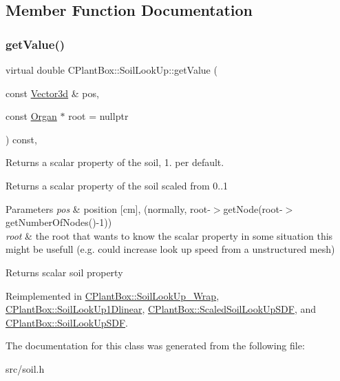 \subsection{Member Function Documentation}
\mbox{\label{classCPlantBox_1_1SoilLookUp_a46ace0d168532b6eb9bec8e6a1d64814}} 
\subsubsection{\texorpdfstring{get\+Value()}{getValue()}}
{\footnotesize\ttfamily virtual double C\+Plant\+Box\+::\+Soil\+Look\+Up\+::get\+Value (\begin{DoxyParamCaption}\item[{const \hyperlink{classCPlantBox_1_1Vector3d}{Vector3d} \&}]{pos,  }\item[{const \hyperlink{classCPlantBox_1_1Organ}{Organ} $\ast$}]{root = {\ttfamily nullptr} }\end{DoxyParamCaption}) const\hspace{0.3cm}{\ttfamily [inline]}, {\ttfamily [virtual]}}



Returns a scalar property of the soil, 1. per default. 

Returns a scalar property of the soil scaled from 0..1


\begin{DoxyParams}{Parameters}
{\em pos} & position \mbox{[}cm\mbox{]}, (normally, root-\/$>$get\+Node(root-\/$>$get\+Number\+Of\+Nodes()-\/1)) \\
\hline
{\em root} & the root that wants to know the scalar property in some situation this might be usefull (e.\+g. could increase look up speed from a unstructured mesh) \\
\hline
\end{DoxyParams}
\begin{DoxyReturn}{Returns}
scalar soil property 
\end{DoxyReturn}


Reimplemented in \hyperlink{classCPlantBox_1_1SoilLookUp__Wrap_aa0d7d887b8dba944b504bb9c28cb87ac}{C\+Plant\+Box\+::\+Soil\+Look\+Up\+\_\+\+Wrap}, \hyperlink{classCPlantBox_1_1SoilLookUp1Dlinear_ae2d2ada13590b9b118f207f647652db8}{C\+Plant\+Box\+::\+Soil\+Look\+Up1\+Dlinear}, \hyperlink{classCPlantBox_1_1ScaledSoilLookUpSDF_a3afdf16c07ae27a10602c74a9fac49b9}{C\+Plant\+Box\+::\+Scaled\+Soil\+Look\+Up\+S\+DF}, and \hyperlink{classCPlantBox_1_1SoilLookUpSDF_a0382e425fc19f70dcc3309db991ef8f5}{C\+Plant\+Box\+::\+Soil\+Look\+Up\+S\+DF}.



The documentation for this class was generated from the following file\+:\begin{DoxyCompactItemize}
\item 
src/soil.\+h\end{DoxyCompactItemize}
